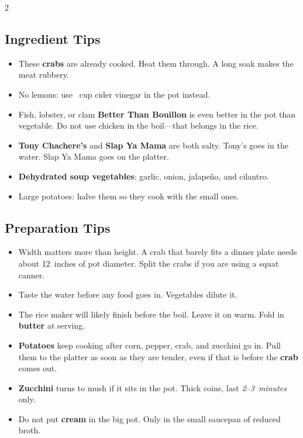 \documentclass[11pt,letterpaper]{article}
\begin{document}
{\begin{multicols}{2}
\subsection*{Ingredient Tips}
\begin{itemize}
    \item These \textbf{crabs} are already cooked. Heat them through. A long soak makes the meat rubbery.
    \item No lemons: use ~cup cider vinegar in the pot instead.
    \item Fish, lobster, or clam \textbf{Better Than Bouillon} is even better in the pot than vegetable. Do not use chicken in the boil---that belongs in the rice.
    \item \textbf{Tony Chachere's} and \textbf{Slap Ya Mama} are both salty. Tony's goes in the water. Slap Ya Mama goes on the platter.
    \item \textbf{Dehydrated soup vegetables}: garlic, onion, jalape\~{n}o, and cilantro.
    \item Large potatoes: halve them so they cook with the small ones.
\end{itemize}

\subsection*{Preparation Tips}
\begin{itemize}
    \item Width matters more than height. A crab that barely fits a dinner plate needs about 12~inches of pot diameter. Split the crabs if you are using a squat canner.
    \item Taste the water before any food goes in. Vegetables dilute it.
    \item The rice maker will likely finish before the boil. Leave it on warm. Fold in \textbf{butter} at serving.
    \item \textbf{Potatoes} keep cooking after corn, pepper, crab, and zucchini go in. Pull them to the platter as soon as they are tender, even if that is before the \textbf{crab} comes out.
    \item \textbf{Zucchini} turns to mush if it sits in the pot. Thick coins, last \textit{2--3~minutes} only.
    \item Do not put \textbf{cream} in the big pot. Only in the small saucepan of reduced broth.
\end{itemize}


\end{multicols}}
\end{document}
